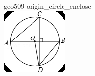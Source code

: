 \documentclass[12pt]{article}
\begin{document}
\begin{center}
\begin{minipage}{0.32\textwidth}
\end{minipage}
\hfill\begin{minipage}{0.32\textwidth}\centering
geo509-origin\_circle\_enclose\\
\includegraphics[width=0.95\linewidth]{out_rommath_origin/items/geo509-origin/assets/figure_circle.png}
\end{minipage}
\par
\end{center}
\bigskip
\end{document}
